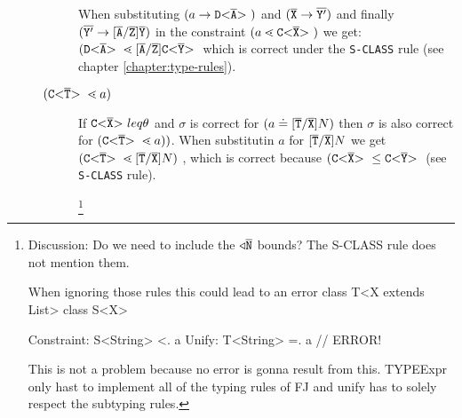 \documentclass[runningheads]{llncs}
\begin{document}
\begin{description}
\begin{description}
When substituting $(a \to \mathtt{D {\tt <} \overline{\tt A} {\tt >} \ })$ and $(\overline{\tt X} \to \overline{\tt Y'})$
and finally $ (\overline{\tt Y'} \to [\overline{\tt A}/\overline{\tt Z}]\overline{\tt Y})$ in the constraint $(a \lessdot \mathtt{C {\tt <} \overline{\tt X} {\tt >} \ })$
we get: $(\mathtt{D {\tt <} \overline{\tt A} {\tt >} \ } \lessdot [\overline{\tt A}/\overline{\tt Z}]\mathtt{C {\tt <} \overline{\tt Y} {\tt >} \ }$
which is correct under the \texttt{S-CLASS} rule (see chapter \ref{chapter:type-rules}).

\item[$(\mathtt{C {\tt <} \overline{\tt T} {\tt >} \ } \lessdot a)$] If $\mathtt{C {\tt <} \overline{\tt X} {\tt >} \ } leq \theta$ and $\sigma$ is correct for $(a \doteq [\overline{\tt T}/\overline{\tt X}]N)$
then $\sigma$ is also correct for $(\mathtt{C {\tt <} \overline{\tt T} {\tt >} \ } \lessdot a))$.
When substitutin $a$ for $[\overline{\tt T}/\overline{\tt X}]N$ we get 
$(\mathtt{C {\tt <} \overline{\tt T} {\tt >} \ } \lessdot [\overline{\tt T}/\overline{\tt X}]N)$
, which is correct because $(\mathtt{C {\tt <} \overline{\tt X} {\tt >} \ } \leq \mathtt{C {\tt <} \overline{\tt Y} {\tt >} \ }$
(see \texttt{S-CLASS} rule).

\footnote{
Discussion:
Do we need to include the $\triangleleft \overline{\tt N}$ bounds?
The S-CLASS rule does not mention them.

When ignoring those rules this could lead to an error
class T<X extends List> {
}
class S<X>{}

Constraint: S<String> <. a
Unify: T<String> =. a // ERROR!

This is not a problem because no error is gonna result from this.
TYPEExpr only hast to implement all of the typing rules of FJ
and unify has to solely respect the subtyping rules.

}
\end{description}


\end{description}
\end{document}

